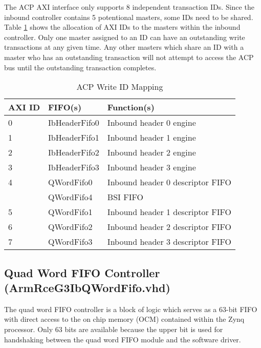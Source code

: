 \documentclass[11pt]{article}
\begin{document}
The ACP AXI interface only supports 8 independent transaction IDs. Since the inbound controller contains 5 potentional masters, some
IDs need to be shared. Table \ref{tab:ib_id_mappings} shows the allocation of AXI IDs to the masters within the inbound
controller. Only one master assigned to an ID can have an outstanding write transactions at any given time. Any other
masters which share an ID with a master who has an outstanding transaction will not attempt to access the ACP bus
until the outstanding transaction completes.

\begin{table}[H]
\small
\centering
   \begin{tabular}{| l | l | l |}
      \hline \textbf{AXI ID} & \textbf{FIFO(s)}      & \textbf{Function(s)}    \\
      \hline 0               & IbHeaderFifo0         & Inbound header 0 engine \\
      \hline 1               & IbHeaderFifo1         & Inbound header 1 engine \\
      \hline 2               & IbHeaderFifo2         & Inbound header 2 engine \\
      \hline 3               & IbHeaderFifo3         & Inbound header 3 engine \\
      \hline 4               & QWordFifo0            & Inbound header 0 descriptor FIFO    \\
                             & QWordFifo4            & BSI FIFO                \\
      \hline 5               & QWordFifo1            & Inbound header 1 descriptor FIFO   \\
      \hline 6               & QWordFifo2            & Inbound header 2 descriptor FIFO   \\
      \hline 7               & QWordFifo3            & Inbound header 3 descriptor FIFO   \\
      \hline
   \end{tabular}
   \caption{ACP Write ID Mapping}
   \label{tab:ib_id_mappings}
\end{table}

\subsection{Quad Word FIFO Controller (ArmRceG3IbQWordFifo.vhd)}
\label{subsec:ArmRceG3IbQWordFifo}

The quad word FIFO controller is a block of logic which serves as a 63-bit FIFO with direct access to the on chip memory (OCM) contained within the 
Zynq processor. Only 63 bits are available because the upper bit is used for handshaking between the quad word FIFO module and the software 
driver. 
\end{document}
